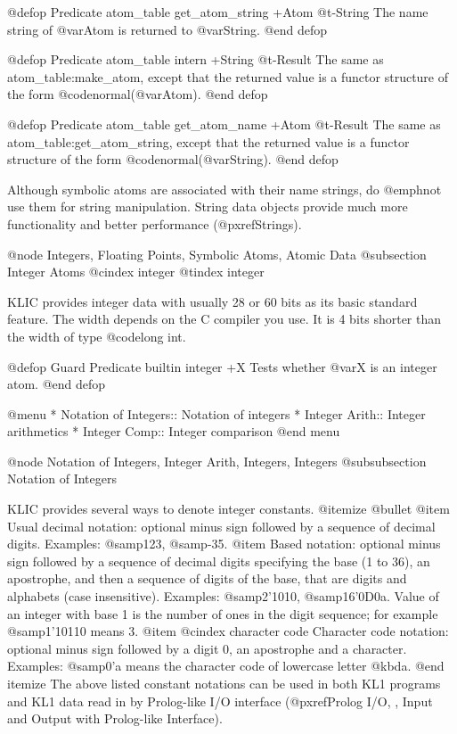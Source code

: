 {{@defop {Predicate} {atom_table} get_atom_string +Atom @t{-}String
The name string of @var{Atom} is returned to @var{String}.
@end defop

@defop {Predicate} {atom_table} intern +String @t{-}Result
The same as atom_table:make_atom, except that the returned value is a
functor structure of the form @code{normal(@var{Atom})}.
@end defop

@defop {Predicate} {atom_table} get_atom_name +Atom @t{-}Result
The same as atom_table:get_atom_string, except that the returned value
is a functor structure of the form @code{normal(@var{String})}.
@end defop

Although symbolic atoms are associated with their name strings, do
@emph{not} use them for string manipulation.  String data objects
provide much more functionality and better performance
(@pxref{Strings}).

@node Integers, Floating Points, Symbolic Atoms, Atomic Data
@subsection Integer Atoms
@cindex integer
@tindex integer

KLIC provides integer data with usually 28 or 60 bits as its basic
standard feature.  The width depends on the C compiler you use.  It is 4
bits shorter than the width of type @code{long int}.

@defop {Guard Predicate} {builtin} integer +X
Tests whether @var{X} is an integer atom.
@end defop

@menu
* Notation of Integers::        Notation of integers
* Integer Arith::               Integer arithmetics
* Integer Comp::                Integer comparison
@end menu

@node Notation of Integers, Integer Arith, Integers, Integers
@subsubsection Notation of Integers

KLIC provides several ways to denote integer constants.
@itemize @bullet
@item
Usual decimal notation: optional minus sign followed by a sequence of
decimal digits.  Examples: @samp{123}, @samp{-35}.
@item
Based notation: optional minus sign followed by a sequence of decimal
digits specifying the base (1 to 36), an apostrophe, and then a sequence
of digits of the base, that are digits and alphabets (case insensitive).
Examples: @samp{2'1010}, @samp{16'0D0a}.  Value of an integer with base
1 is the number of ones in the digit sequence; for example
@samp{1'10110} means 3.
@item
@cindex character code
Character code notation: optional minus sign followed by a digit 0, an
apostrophe and a character.  Examples: @samp{0'a} means the character
code of lowercase letter @kbd{a}.
@end itemize
The above listed constant notations can be used in both KL1 programs and
KL1 data read in by Prolog-like I/O interface (@pxref{Prolog I/O, ,
Input and Output with Prolog-like Interface}).

}}
